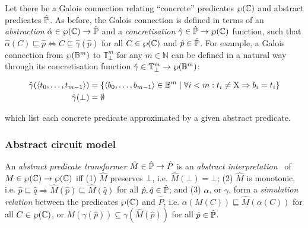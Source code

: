 Let there be a Galois connection relating ``concrete'' predicates $\wp(\mathbb{C})$ and abstract predicates $\hat{\mathbb{P}}$. As before, the Galois connection is defined in terms of an \textit{abstraction} $\hat \alpha \in \wp(\mathbb{C}) \rightarrow \hat{\mathbb{P}}$ and a \textit{concretisation} $\hat \gamma \in \hat{\mathbb{P}} \rightarrow \wp(\mathbb{C})$ function, such that $\hat \alpha(C) \sqsubseteq \hat p \iff C \subseteq \hat \gamma(\hat p)$ for all $C \in \wp(\mathbb{C})$ and $\hat p \in \hat{\mathbb{P}}$. For example, a Galois connection from $\wp(\mathbb{B}^{m})$ to $\mathbb{T}_{\bot}^{m}$ for any $m \in \mathbb{N}$ can be defined in a natural way through its concretisation function $\hat \gamma \in \mathbb{T}_{\bot}^{m} \rightarrow \wp(\mathbb{B}^{m})$:

\begin{align*}
\hat \gamma ( \langle t_{0}, \dots,t_{m-1} \rangle ) &= \{ \langle b_{0}, \dots,b_{m-1} \rangle \in \mathbb{B}^{m} \mid \forall i < m : t_{i} \neq \mathrm{X} \Rightarrow b_{i} = t_{i} \} \\
\hat \gamma ( \bot ) &= \emptyset
\end{align*}

\noindent which list each concrete predicate approximated by a given abstract predicate.



\subsubsection{Abstract circuit model} \label{sec:lat-ste-model}

An \textit{abstract predicate transformer} $\hat M \in \hat{\mathbb{P}} \rightarrow \hat P$ is an \textit{abstract interpretation}~\cite{chou1999,cousot1996} of $M \in \wp(\mathbb{C}) \rightarrow \wp(\mathbb{C})$ iff (1) $\hat M$ preserves $\bot$, i.e. $\hat M(\bot) = \bot$; (2) $\hat M$ is monotonic, i.e. $\hat p \sqsubseteq \hat q \Rightarrow \hat M (\hat p) \sqsubseteq \hat M (\hat q)$ for all $\hat p, \hat q \in \hat{\mathbb{P}}$; and (3) $\alpha$, or $\gamma$, form a \textit{simulation relation} between the predicates $\wp(\mathbb{C})$ and $\hat P$, i.e. $\alpha(M(C)) \sqsubseteq \hat M(\alpha(C))$ for all $C \in \wp(\mathbb{C})$, or $M(\gamma(\hat p)) \subseteq \gamma(\hat M(\hat p))$ for all $\hat p \in \hat{\mathbb{P}}$.

